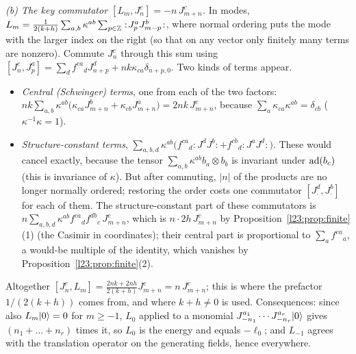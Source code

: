 \emph{(b) The key commutator $[L_m,J^c_n]=-n\,J^c_{m+n}$.} In modes,
$L_m=\frac{1}{2(k+h)}\sum_{a,b}\kappa^{ab}\sum_{p\in{\mathbb{Z}}}:\!J^a_pJ^b_{m-p}\!:$, where normal ordering puts the mode with the larger
index on the right (so that on any vector only finitely many terms are nonzero). Commute $J^c_n$ through this sum using
$[J^c_n,J^a_p]=\sum_df^{ca}{}_dJ^d_{n+p}+nk\kappa_{ca}\delta_{n+p,0}$. Two kinds of terms appear.
\begin{itemize}
\item \emph{Central (Schwinger) terms}, one from each of the two factors:
  $nk\sum_{a,b}\kappa^{ab}\big(\kappa_{ca}J^b_{m+n}+\kappa_{cb}J^a_{m+n}\big)=2nk\,J^c_{m+n}$, because
  $\sum_a\kappa_{ca}\kappa^{ab}=\delta_{cb}$ ($\kappa^{-1}\kappa=1$).
\item \emph{Structure-constant terms}, $\sum_{a,b,d}\kappa^{ab}\big(f^{ca}{}_d:\!J^dJ^b\!:+f^{cb}{}_d:\!J^aJ^d\!:\big)$. These would cancel
  exactly, because the tensor $\sum_{a,b}\kappa^{ab}b_a\otimes b_b$ is invariant under $\operatorname{ad}(b_c)$ (this is invariance of
  $\kappa$). But after commuting, $|n|$ of the products are no longer normally ordered; restoring the order costs one commutator
  $[J^d_\cdot,J^b_\cdot]$ for each of them. The structure-constant part of these commutators is
  $n\sum_{a,b,d}\kappa^{ab}f^{ca}{}_df^{db}{}_e\,J^e_{m+n}$, which is $n\cdot2h\,J^c_{m+n}$ by Proposition~\ref{l23:prop:finite}(1)
  (the Casimir in coordinates); their central part is proportional to $\sum_af^{ca}{}_a$, a would-be multiple of the identity, which
  vanishes by Proposition~\ref{l23:prop:finite}(2).
\end{itemize}
Altogether $[J^c_n,L_m]=\frac{2nk+2nh}{2(k+h)}J^c_{m+n}=n\,J^c_{m+n}$; this is where the prefactor $1/(2(k+h))$ comes from, and
where $k+h\ne0$ is used. Consequences: since also $L_m|0\rangle=0$ for $m\ge-1$, $L_0$ applied to a monomial
$J^{a_1}_{-n_1}\cdots J^{a_r}_{-n_r}|0\rangle$ gives $(n_1+\dots+n_r)$ times it, so $L_0$ is the energy and equals $-\ell_0$; and
$L_{-1}$ agrees with the translation operator on the generating fields, hence everywhere.

